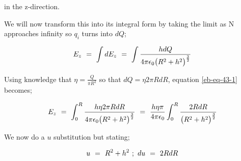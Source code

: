 \documentclass{article}
\begin{document}
in the z-direction. 

We will now transform this into its integral form by taking the limit as N approaches infinity so \begin{math} q_{i} \end{math} turns into \begin{math} dQ \end{math};

\begin{equation} \label{eb-eq-46-1}
E_{z} \hspace{0.125cm} = \hspace{0.125cm} \int d E_{z}  \hspace{0.125cm} = \hspace{0.125cm} \int \frac{h dQ}{4\pi \epsilon_{0} \big( R^{2} + h^2\big)^{\frac{3}{2}}}
\end{equation}

Using knowledge that \begin{math} \eta = \frac{Q}{\pi R^{2}} \end{math} so that \begin{math} dQ = \eta 2 \pi R dR \end{math}, equation \ref{eb-eq-43-1} becomes;

\begin{equation} \label{eb-eq-47-1}
E_{z} \hspace{0.125cm} = \hspace{0.125cm} \int_{0}^{R} \frac{h \eta 2 \pi R dR}{4\pi \epsilon_{0} \big( R^{2} + h^2\big)^{\frac{3}{2}}} \hspace{0.125cm} = \hspace{0.125cm} \frac{h \eta \pi}{4\pi \epsilon_{0}} \int_{0}^{R} \frac{2R dR}{\big( R^{2} + h^2\big)^{\frac{3}{2}}}
\end{equation}

We now do a \begin{math} u \end{math} substitution but stating;

\begin{equation} \label{eb-eq-45-2}
u \hspace{0.125cm} = \hspace{0.125cm} R^2 + h^2 \hspace{0.125cm} ; \hspace{0.125cm} du \hspace{0.125cm}  = \hspace{0.125cm}  2R dR
\end{equation}
\end{document}

